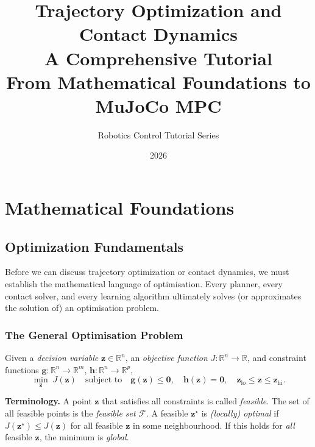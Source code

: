 \documentclass[11pt,twoside]{report}
\title{\Huge\bfseries Trajectory Optimization and Contact Dynamics\\[6pt]
\Large A Comprehensive Tutorial\\[3pt]
\large From Mathematical Foundations to MuJoCo MPC}
\author{Robotics Control Tutorial Series}
\date{2026}
\theoremstyle{definition}
\theoremstyle{plain}
\theoremstyle{remark}
\newcommand{\R}{\mathbb{R}}
\newcommand{\0}{\bm{0}}
\begin{document}
\maketitle
\tableofcontents

\part{Mathematical Foundations}

\chapter{Optimization Fundamentals}
\label{ch:opt-fundamentals}

Before we can discuss trajectory optimization or contact dynamics,
we must establish the mathematical language of optimisation.
Every planner, every contact solver, and every learning algorithm
ultimately solves (or approximates the solution of) an optimisation
problem.

\section{The General Optimisation Problem}

\begin{definitionbox}
Given a \emph{decision variable} $\bm{z}\in\R^{n}$,
an \emph{objective function} $J:\R^{n}\to\R$, and constraint
functions $\bm{g}:\R^{n}\to\R^{m}$, $\bm{h}:\R^{n}\to\R^{p}$,
\begin{equation}\label{eq:general-opt}
\min_{\bm{z}}\; J(\bm{z})
\quad\text{subject to}\quad
\bm{g}(\bm{z})\le \0,\quad
\bm{h}(\bm{z})=\0,\quad
\bm{z}_{\text{lo}}\le\bm{z}\le\bm{z}_{\text{hi}}.
\end{equation}
\end{definitionbox}

\textbf{Terminology.}
A point $\bm{z}$ that satisfies all constraints is called \emph{feasible}.
The set of all feasible points is the \emph{feasible set} $\mathcal{F}$.
A feasible $\bm{z}^{\star}$ is \emph{(locally) optimal} if
$J(\bm{z}^{\star})\le J(\bm{z})$
for all feasible $\bm{z}$ in some neighbourhood.
If this holds for \emph{all} feasible $\bm{z}$, the minimum is \emph{global}.
\end{document}
